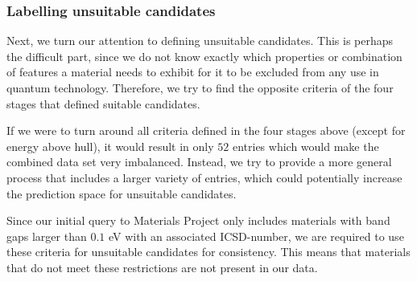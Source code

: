 \begin{table}[!ht]
\centering
\caption{A table that compares two different implementations of the same screen procedure. \citeauthor{Ferrenti2020} extracted information March of $2020$, while we did the extraction during April of $2021$. The adjusted difference is given as our reported entries divided on their reported entries.}
\label{tab:approach-1-suitable-candidates}
\noindent{}
\end{table}

\subsubsection{Labelling unsuitable candidates}

Next, we turn our attention to defining unsuitable candidates. This is perhaps the difficult part, since we do not know exactly which properties or combination of features a material needs to exhibit for it to be excluded from any use in quantum technology. Therefore, we try to find the opposite criteria of the four stages that defined suitable candidates.

If we were to turn around all criteria defined in the four stages above (except for energy above hull), it would result in only $52$ entries which would make the combined data set very imbalanced. Instead, we try to provide a more general process that includes a larger variety of entries, which could potentially increase the prediction space for unsuitable candidates.

\noindent Since our initial query to Materials Project only includes materials with band gaps larger than $0.1$ eV with an associated ICSD-number, we are required to use these criteria for unsuitable candidates for consistency. This means that materials that do not meet these restrictions are not present in our data.

